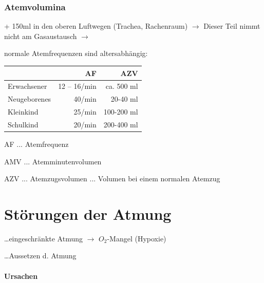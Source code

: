 

\subsubsection{Atemvolumina}\label{topic:atemvolumina}


\begin{center}


\end{center}
+ 150ml in den oberen Luftwegen (Trachea, Rachenraum) ${\rightarrow}$
Dieser Teil nimmt nicht am Gasaustausch ${\rightarrow}$

normale Atemfrequenzen sind altersabh\"angig:

\begin{center}
\begin{tabular}{lrr}
\toprule
 & AF &  AZV
\\\midrule
Erwachsener & 12 -- 16/min  & ca. 500 ml
\\
Neugeborenes & 40/min & 20-40 ml 
\\
Kleinkind & 25/min & 100-200 ml
\\
Schulkind & 20/min & 200-400 ml
\\\bottomrule
\end{tabular}
\end{center}


AF  ... Atemfrequenz

AMV  ... Atemminutenvolumen

AZV  ... Atemzugsvolumen ... Volumen bei einem normalen Atemzug

\section{St\"orungen der Atmung}

 \ldots eingeschr\"ankte Atmung
$\rightarrow$ $O_2$-Mangel (Hypoxie)   

 \ldots Aussetzen d. Atmung 

\paragraph{Ursachen}~

